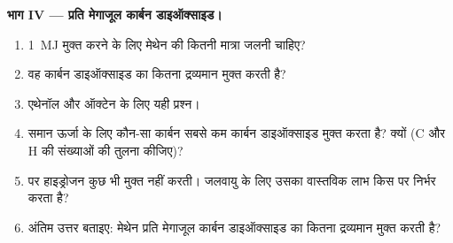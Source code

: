 \begin{problem}
\medskip
\noindent\textbf{भाग IV --- प्रति मेगाजूल कार्बन डाइऑक्साइड।}
\begin{enumerate}[resume]
  \item \qty{1}{MJ} मुक्त करने के लिए मेथेन की कितनी मात्रा जलनी चाहिए?
  \item वह कार्बन डाइऑक्साइड का कितना द्रव्यमान मुक्त करती है?
  \item एथेनॉल और ऑक्टेन के लिए यही प्रश्न।
  \item समान ऊर्जा के लिए कौन-सा कार्बन  सबसे कम कार्बन डाइऑक्साइड
        मुक्त करता है? क्यों (C और H  की संख्याओं की तुलना कीजिए)?
  \item {} पर हाइड्रोजन कुछ भी मुक्त नहीं करती। जलवायु के लिए उसका
        वास्तविक लाभ किस पर निर्भर करता है?
  \item अंतिम उत्तर बताइए: मेथेन प्रति मेगाजूल कार्बन डाइऑक्साइड का कितना
        द्रव्यमान मुक्त करती है?
\end{enumerate}
\end{problem}
